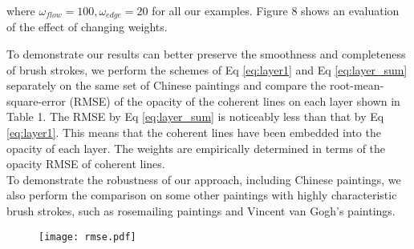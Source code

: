 where $\omega_{flow}=100, \omega_{edge}=20 $ for all our examples. Figure 8 shows an evaluation of the effect of changing weights.

To demonstrate our results can better preserve the smoothness and completeness of brush strokes, we perform the schemes of Eq \ref{eq:layer1} and Eq \ref{eq:layer_sum} separately on the same set of Chinese paintings and compare the root-mean-square-error (RMSE) of the opacity of the coherent lines on each layer shown in Table 1. The RMSE by Eq \ref{eq:layer_sum} is noticeably less than that by Eq \ref{eq:layer1}. This means that the coherent lines have been embedded into the opacity of each layer. The weights are empirically determined in terms of the opacity RMSE of coherent lines. \\
To demonstrate the robustness of our approach, including Chinese paintings, we also perform the comparison on some other paintings with highly characteristic brush strokes, such as rosemailing paintings\cite{ellingsgard1978rosemaling} and Vincent van Gogh's paintings\cite{li2012rhythmic}.

\begin{figure}
	\centering
	\texttt{[image: rmse.pdf]}

\end{figure}

















